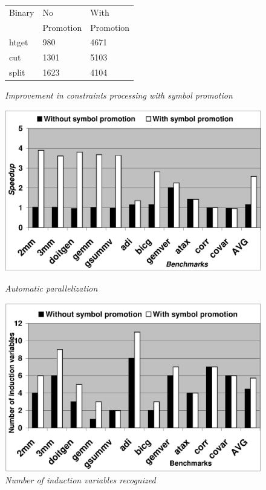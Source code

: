 \begin{figure}[t]
{{\begin{minipage}{.21\linewidth}
{\begin{scriptsize}
\begin{tabular}{|l|l|l|}
\hline
{Binary}&{No}&{With}\\ 
{}&{Promotion}&{Promotion}\\ \hline
htget&980&4671\\ \hline
cut&1301&5103\\ \hline
split&1623&4104\\ \hline
\end{tabular}
\caption {{\textit{Improvement in constraints processing with symbol promotion }}}
\label{fig:results-symExecSymMem}
\end{scriptsize}%
}
\end{minipage}
\hfill
\hspace{1ex}
\begin{minipage}{.24\linewidth}
\centering
{
\includegraphics[width=\linewidth]{figures/EPS/parallel-runtime.eps}
\caption{{\textit{Automatic parallelization}}}
\label{fig:parallel-runtime}
}
\end{minipage} 
\hfill
\begin{minipage}{.24\linewidth}
\centering
{
\includegraphics[width=\linewidth]{figures/EPS/induction-var.eps}
\caption{{\textit{Number of induction variables recognized}}}
\label{fig:parallel-indvar}
}
\end{minipage}
}
\vspace{-3ex}
}
\end{figure}
